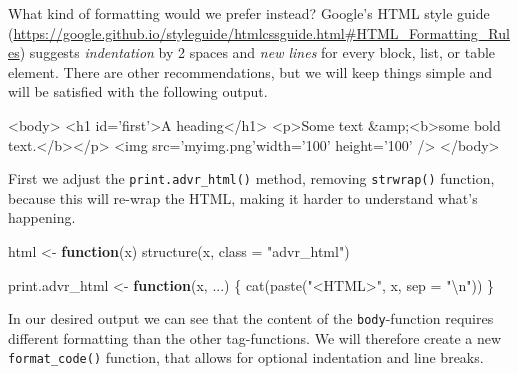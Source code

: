 \documentclass[
]{krantz}
\makeatletter
\newenvironment{Shaded}{\begin{snugshade}}{\end{snugshade}}
\newcommand{\CharTok}[1]{\textcolor[rgb]{0.31,0.60,0.02}{#1}}
\newcommand{\ControlFlowTok}[1]{\textcolor[rgb]{0.13,0.29,0.53}{\textbf{#1}}}
\newcommand{\DataTypeTok}[1]{\textcolor[rgb]{0.13,0.29,0.53}{#1}}
\newcommand{\DecValTok}[1]{\textcolor[rgb]{0.00,0.00,0.81}{#1}}
\newcommand{\ErrorTok}[1]{\textcolor[rgb]{0.64,0.00,0.00}{\textbf{#1}}}
\newcommand{\KeywordTok}[1]{\textcolor[rgb]{0.13,0.29,0.53}{\textbf{#1}}}
\newcommand{\NormalTok}[1]{#1}
\newcommand{\OtherTok}[1]{\textcolor[rgb]{0.56,0.35,0.01}{#1}}
\newcommand{\StringTok}[1]{\textcolor[rgb]{0.31,0.60,0.02}{#1}}
\renewcommand{\href}[2]{#2 (\url{#1})}
\newenvironment{kframe}{%
\medskip{}
\setlength{\fboxsep}{.8em}
 \def\at@end@of@kframe{}%
 \ifinner\ifhmode%
  \def\at@end@of@kframe{\end{minipage}}%
  \begin{minipage}{\columnwidth}%
 \fi\fi%
 \def\FrameCommand##1{\hskip\@totalleftmargin \hskip-\fboxsep
 \colorbox{shadecolor}{##1}\hskip-\fboxsep
     \hskip-\linewidth \hskip-\@totalleftmargin \hskip\columnwidth}%
 \MakeFramed {\advance\hsize-\width
   \@totalleftmargin\z@ \linewidth\hsize
   \@setminipage}}%
 {\par\unskip\endMakeFramed%
 \at@end@of@kframe}
\renewenvironment{Shaded}{\begin{kframe}}{\end{kframe}}
\renewcommand{\KeywordTok} [1]{\textcolor[rgb]{0.00,0.44,0.13}{{#1}}}
\renewcommand{\DataTypeTok}[1]{\textcolor[rgb]{0.56,0.13,0.00}{{#1}}}
\renewcommand{\DecValTok}  [1]{\textcolor[rgb]{0.25,0.63,0.44}{{#1}}}
\renewcommand{\CharTok}    [1]{\textcolor[rgb]{0.25,0.44,0.63}{{#1}}}
\renewcommand{\StringTok}  [1]{\textcolor[rgb]{0.25,0.44,0.63}{{#1}}}
\renewcommand{\OtherTok}   [1]{\textcolor[rgb]{0.00,0.44,0.13}{{#1}}}
\renewcommand{\ErrorTok}   [1]{\textcolor[rgb]{1.00,0.00,0.00}{{#1}}}
\renewcommand{\NormalTok}  [1]{{#1}}
\makeatother
\begin{document}
What kind of formatting would we prefer instead? \href{https://google.github.io/styleguide/htmlcssguide.html\#HTML_Formatting_Rules}{Google's HTML style guide} suggests \emph{indentation} by 2 spaces and \emph{new lines} for every block, list, or table element. There are other recommendations, but we will keep things simple and will be satisfied with the following output.

\begin{Shaded}
\begin{Highlighting}[]
\KeywordTok{<body>}
  \KeywordTok{<h1}\OtherTok{ id=}\StringTok{'first'}\KeywordTok{>}\NormalTok{A heading}\KeywordTok{</h1>}
  \KeywordTok{<p>}\NormalTok{Some text }\DecValTok{&amp;}\KeywordTok{<b>}\NormalTok{some bold text.}\KeywordTok{</b></p>}
  \KeywordTok{<img}\OtherTok{ src=}\StringTok{'myimg.png'}\ErrorTok{width}\OtherTok{=}\StringTok{'100'}\OtherTok{ height=}\StringTok{'100'} \KeywordTok{/>}
\KeywordTok{</body>}
\end{Highlighting}
\end{Shaded}

First we adjust the \texttt{print.advr\_html()} method, removing \texttt{strwrap()} function, because this will re-wrap the HTML, making it harder to understand what's happening.

\begin{Shaded}
\begin{Highlighting}[]
\NormalTok{html <-}\StringTok{ }\ControlFlowTok{function}\NormalTok{(x) }\KeywordTok{structure}\NormalTok{(x, }\DataTypeTok{class =} \StringTok{"advr_html"}\NormalTok{)}

\NormalTok{print.advr_html <-}\StringTok{ }\ControlFlowTok{function}\NormalTok{(x, ...) \{}
  \KeywordTok{cat}\NormalTok{(}\KeywordTok{paste}\NormalTok{(}\StringTok{"<HTML>"}\NormalTok{, x, }\DataTypeTok{sep =} \StringTok{"}\CharTok{\textbackslash{}n}\StringTok{"}\NormalTok{))}
\NormalTok{\}}
\end{Highlighting}
\end{Shaded}

In our desired output we can see that the content of the \texttt{body}-function requires different formatting than the other tag-functions. We will therefore create a new \texttt{format\_code()} function, that allows for optional indentation and line breaks.
\end{document}
